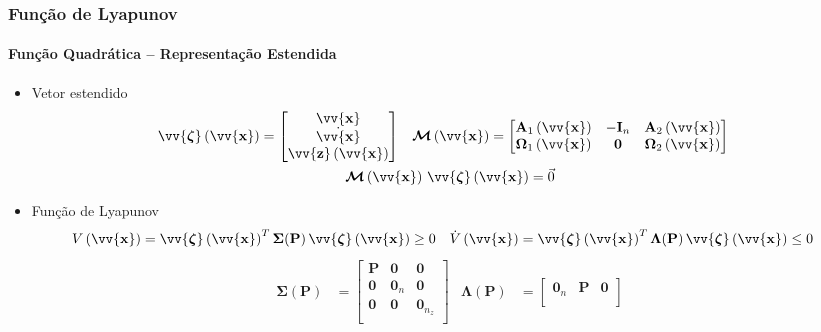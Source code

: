 \documentclass{beamer}
\newcommand*{\Round}[1]{\left(#1\right)}
\newcommand*{\Prod}{\,}
\newcommand*{\Bold}[1]{\boldsymbol{\mathbf{#1}}}
\newcommand*{\Matr}[1]{\Bold{#1}}
\newcommand*{\Vect}[1]{\vv{\Bold{#1}}}
\newcommand*{\Transp}[1]{{#1}^{T}}
\renewcommand{\Prod}{\,}
\begin{document}
\begin{frame}\frametitle{Função de Lyapunov}\framesubtitle{Função Quadrática -- Representação Estendida}
  \begin{itemize}
    \item Vetor estendido
    \begin{gather}
      \begin{aligned}
        \Vect{\zeta}\Round{\Vect{x}}
        &= \begin{bmatrix} \Vect{x} \\ \dot{\Vect{x}} \\ \Vect{z}\Round{\Vect{x}} \end{bmatrix}
        &
        \Matr{\mathcal{M}}\Round{\Vect{x}}
        &= \begin{bmatrix}
          \Matr{A}_1\Round{\Vect{x}}      & -\Matr{I}_n & \Matr{A}_2\Round{\Vect{x}}      \\
          \Matr{\Omega}_1\Round{\Vect{x}} & \Matr{0}    & \Matr{\Omega}_2\Round{\Vect{x}} \\
        \end{bmatrix}
      \end{aligned}
      \\
      \Matr{\mathcal{M}}\Round{\Vect{x}} \Prod \Vect{\zeta}\Round{\Vect{x}} = \vec{0}
    \end{gather}
    \item Função de Lyapunov
    \small
    \begin{align}
      V\Round{\Vect{x}}
      &= \Transp{\Vect{\zeta}\Round{\Vect{x}}} \Prod \Matr{\Sigma}(\Matr{P}) \Prod \Vect{\zeta}\Round{\Vect{x}} \geq 0
      &
      \dot{V}\Round{\Vect{x}}
      &= \Transp{\Vect{\zeta}\Round{\Vect{x}}} \Prod \Matr{\Lambda}(\Matr{P}) \Prod \Vect{\zeta}\Round{\Vect{x}} \leq 0
    \end{align}
    \normalsize
    \vspace{-18pt}
    \begin{align}
    \Matr{\Sigma}(\Matr{P})
      &= \begin{bmatrix}
        \Matr{P}  & \Matr{0}   & \Matr{0}       \\
        \Matr{0}  & \Matr{0}_n & \Matr{0}       \\
        \Matr{0}  & \Matr{0}   & \Matr{0}_{n_z} \\
      \end{bmatrix}
      &
      \Matr{\Lambda}(\Matr{P})
      &= \begin{bmatrix}
        \Matr{0}_n & \Matr{P}   & \Matr{0}       \\

\end{bmatrix}
\end{align}
\end{itemize}
\end{frame}
\end{document}

